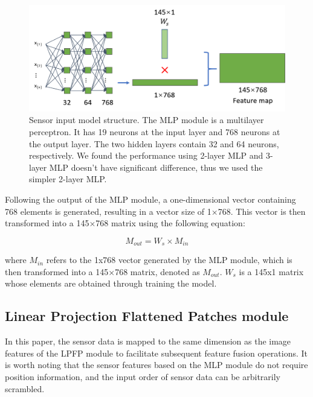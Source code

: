 \documentclass[acmsmall,manuscript, screen, review]{acmart}
\begin{document}
\begin{figure}[htbp]
  \centering
  \includegraphics[width=0.7\linewidth]{pic/mlp_module.png}
  \caption{Sensor input model structure. The MLP module is a multilayer perceptron. It has 19 neurons at the input layer and 768 neurons at the output layer. The two hidden layers contain 32 and 64 neurons, respectively. We found the performance using 2-layer MLP and 3-layer MLP doesn’t have significant difference, thus we used the simpler 2-layer MLP.}
  \label{mlp_module}
\end{figure}
Following the output of the MLP module, a one-dimensional vector containing 768 elements is generated, resulting in a vector size of 1\begin{math}
  \times
\end{math}768. This vector is then transformed into a 145\begin{math}
  \times
\end{math}768 matrix using the following equation:


\begin{equation}
  M_{out}=W_s\times M_{in}
\end{equation}

where  \begin{math}   M_{in} \end{math}  refers to the 1x768 vector generated by the MLP module, which is then transformed into a 145\begin{math}
  \times
\end{math}768 matrix, denoted as \begin{math}
  M_{out}
\end{math}. \begin{math}
  W_s
\end{math} is a 145x1 matrix whose elements are obtained through training the model.

\subsection{Linear Projection Flattened Patches module}
In this paper, the sensor data is mapped to the same dimension as the image features of the LPFP module to facilitate subsequent feature fusion operations. It is worth noting that the sensor features based on the MLP module do not require position information, and the input order of sensor data can be arbitrarily scrambled.
\end{document}
